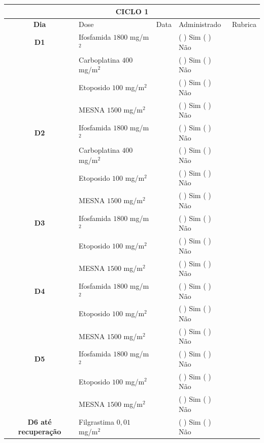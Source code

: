 \documentclass[11pt,a4paper,oldfontcommands]{memoir}
\begin{document}
\renewcommand{\arraystretch}{1.5}

\begin{center}
\begin{longtable}{p{1cm}p{4cm}|p{1cm}|p{3cm}|p{2.9cm}}
	\hline
	\multicolumn{5}{c}{\textbf{CICLO 1}}\\
\hline
    \multicolumn{1}{c|}{\multirow{1}{*}{\textbf{Dia}}}&{Dose}&{Data}&{Administrado}&{Rubrica} \\
    \hline
    \multicolumn{1}{c|}{\multirow{1}{*}{\textbf{D1}}}&{Ifosfamida \(1800\) mg/m\(^2\)}&&{(  ) Sim (  ) Não}&\\
    \multicolumn{1}{c|}{\multirow{1}{*}{\textbf{}}}&{Carboplatina \(400\) mg/m\(^2\)}&&{(  ) Sim (  ) Não}&\\
    \multicolumn{1}{c|}{\multirow{1}{*}{\textbf{}}}&{Etoposido \(100\) mg/m\(^2\)}&&{(  ) Sim (  ) Não}&\\
    \multicolumn{1}{c|}{\multirow{1}{*}{\textbf{}}}&{MESNA \(1500\) mg/m\(^2\)}&&{(  ) Sim (  ) Não}&\\
    \multicolumn{1}{c|}{\multirow{1}{*}{\textbf{D2}}}&{Ifosfamida \(1800\) mg/m\(^2\)}&&{(  ) Sim (  ) Não}&\\
    \multicolumn{1}{c|}{\multirow{1}{*}{\textbf{}}}&{Carboplatina \(400\) mg/m\(^2\)}&&{(  ) Sim (  ) Não}&\\
    \multicolumn{1}{c|}{\multirow{1}{*}{\textbf{}}}&{Etoposido \(100\) mg/m\(^2\)}&&{(  ) Sim (  ) Não}&\\
    \multicolumn{1}{c|}{\multirow{1}{*}{\textbf{}}}&{MESNA \(1500\) mg/m\(^2\)}&&{(  ) Sim (  ) Não}&\\
    \multicolumn{1}{c|}{\multirow{1}{*}{\textbf{D3}}}&{Ifosfamida \(1800\) mg/m\(^2\)}&&{(  ) Sim (  ) Não}&\\
    \multicolumn{1}{c|}{\multirow{1}{*}{\textbf{}}}&{Etoposido \(100\) mg/m\(^2\)}&&{(  ) Sim (  ) Não}&\\
    \multicolumn{1}{c|}{\multirow{1}{*}{\textbf{}}}&{MESNA \(1500\) mg/m\(^2\)}&&{(  ) Sim (  ) Não}&\\
    \multicolumn{1}{c|}{\multirow{1}{*}{\textbf{D4}}}&{Ifosfamida \(1800\) mg/m\(^2\)}&&{(  ) Sim (  ) Não}&\\
    \multicolumn{1}{c|}{\multirow{1}{*}{\textbf{}}}&{Etoposido \(100\) mg/m\(^2\)}&&{(  ) Sim (  ) Não}&\\
    \multicolumn{1}{c|}{\multirow{1}{*}{\textbf{}}}&{MESNA \(1500\) mg/m\(^2\)}&&{(  ) Sim (  ) Não}&\\
    \hline
    \multicolumn{1}{c|}{\multirow{1}{*}{\textbf{D5}}}&{Ifosfamida \(1800\) mg/m\(^2\)}&&{(  ) Sim (  ) Não}&\\
    \multicolumn{1}{c|}{\multirow{1}{*}{\textbf{}}}&{Etoposido \(100\) mg/m\(^2\)}&&{(  ) Sim (  ) Não}&\\
    \multicolumn{1}{c|}{\multirow{1}{*}{\textbf{}}}&{MESNA \(1500\) mg/m\(^2\)}&&{(  ) Sim (  ) Não}&\\
    \multicolumn{1}{c|}{\multirow{1}{*}{\textbf{D6 até recuperação}}}&{Filgrastima \(0,01\) mg/m\(^2\)}&&{(  ) Sim (  ) Não}&\\


\end{longtable}
\end{center}
\end{document}
